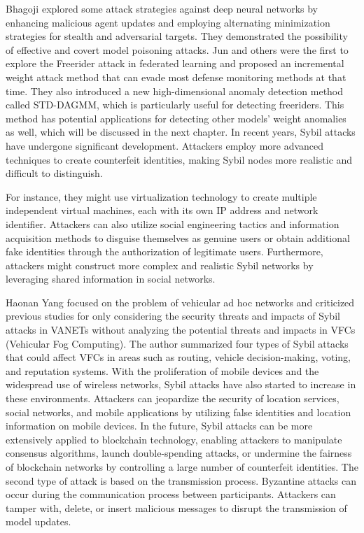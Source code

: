 \documentclass[conference]{IEEEtran}
\begin{document}
Bhagoji \cite{b111} explored some attack strategies against deep neural networks by enhancing malicious agent
updates and employing alternating minimization strategies for stealth and adversarial targets. They demonstrated
the possibility of effective and covert model poisoning attacks. Jun \cite{b112} and others were the first to explore the Freerider attack in federated learning and proposed an incremental weight attack method that can evade most defense monitoring methods at that time. They also introduced a new high-dimensional anomaly detection method called STD-DAGMM, which is particularly useful for detecting freeriders. This method has potential applications for detecting other models' weight anomalies as well, which will be discussed in the next chapter.
In recent years, Sybil attacks have undergone significant development.
Attackers employ more advanced techniques to create counterfeit identities, making Sybil nodes more realistic and difficult to distinguish.

For instance, they might use virtualization technology to create multiple independent virtual machines,
each with its own IP address and network identifier. Attackers can also utilize social engineering tactics and information acquisition methods
to disguise themselves as genuine users or obtain additional fake identities through the authorization of legitimate users.
Furthermore, attackers might construct more complex and realistic Sybil networks by leveraging shared information in social networks.

Haonan Yang \cite{b113} focused on the problem of vehicular ad hoc networks and criticized previous studies for only considering the security threats and impacts of Sybil attacks in VANETs without analyzing the potential threats and impacts in VFCs (Vehicular Fog Computing). The author summarized four types of Sybil attacks that could affect VFCs in areas such as routing, vehicle decision-making, voting, and reputation systems.
With the proliferation of mobile devices and the widespread use of wireless networks, Sybil attacks have also started to increase in these environments. Attackers can jeopardize the security of location services, social networks, and mobile applications by utilizing false identities and location information on mobile devices. In the future, Sybil attacks can be more extensively applied to blockchain technology, enabling attackers to manipulate consensus algorithms, launch double-spending attacks, or undermine the fairness of blockchain networks by controlling a large number of counterfeit identities.
The second type of attack is based on the transmission process. Byzantine attacks can occur during the communication process between participants. Attackers can tamper with, delete, or insert malicious messages to disrupt the transmission of model updates.
\end{document}
